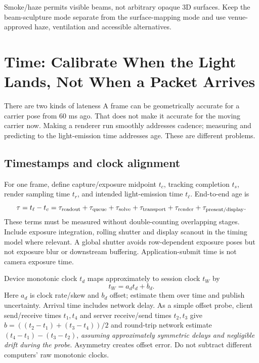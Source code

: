 \documentclass[11pt,a4paper]{article}
\begin{document}
Smoke/haze permits visible beams, not arbitrary opaque 3D surfaces.
Keep the beam-sculpture mode separate from the surface-mapping mode and
use venue-approved haze, ventilation and accessible alternatives.

\section{Time: Calibrate When the Light Lands, Not When a Packet Arrives}
\label{sec:time}

\begin{plain}{There are two kinds of lateness}
A frame can be geometrically accurate for a carrier pose from 60 ms ago.
That does not make it accurate for the moving carrier now.
Making a renderer run smoothly addresses cadence; measuring and predicting
to the light-emission time addresses age. These are different problems.
\end{plain}

\subsection{Timestamps and clock alignment}
For one frame, define capture/exposure midpoint $t_c$, tracking completion
$t_s$, render sampling time $t_r$, and intended light-emission time $t_\ell$.
End-to-end age is
\begin{equation}
\tau=t_\ell-t_c
=\tau_{\rm readout}+\tau_{\rm queue}+\tau_{\rm solve}
 +\tau_{\rm transport}+\tau_{\rm render}
 +\tau_{\rm present/display}.
\label{eq:latency}
\end{equation}
These terms must be measured without double-counting overlapping stages.
Include exposure integration, rolling shutter and display scanout in the
timing model where relevant. A global shutter avoids row-dependent
exposure poses but not exposure blur or downstream buffering.
Application-submit time is not camera exposure time.

Device monotonic clock $t_d$ maps approximately to session clock $t_W$ by
\begin{equation}
t_W=a_dt_d+b_d .
\end{equation}
Here $a_d$ is clock rate/skew and $b_d$ offset; estimate them over time and
publish uncertainty. Arrival time includes network delay.
As a simple offset probe, client send/receive times $t_1,t_4$ and server
receive/send times $t_2,t_3$ give
$\hat b=((t_2-t_1)+(t_3-t_4))/2$ and round-trip network estimate
$(t_4-t_1)-(t_3-t_2)$, \emph{assuming approximately symmetric delays and
negligible drift during the probe}. Asymmetry creates offset error.
Do not subtract different computers' raw monotonic clocks.
\end{document}
